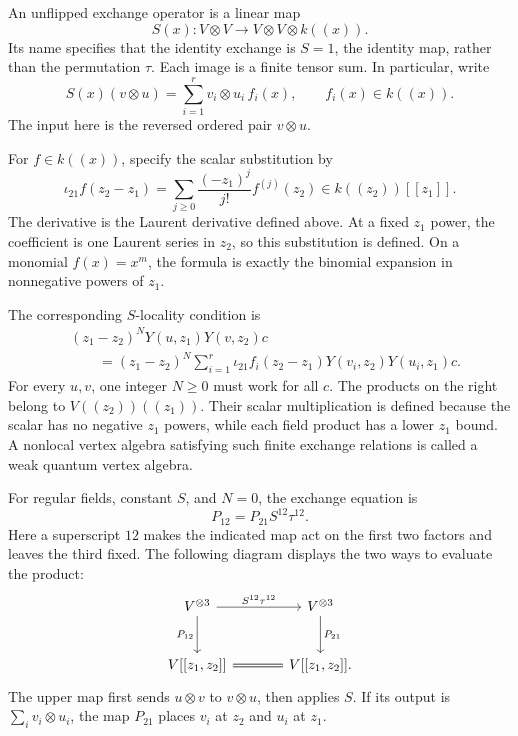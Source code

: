An unflipped exchange operator is a linear map
\[
 S(x):V\otimes V\longrightarrow V\otimes V\otimes k((x)).
\]
Its name specifies that the identity exchange is $S=1$, the
identity map, rather than the permutation $\tau$.
Each image is a finite tensor sum.
In particular, write
\[
 S(x)(v\otimes u)=\sum_{i=1}^r v_i\otimes u_i\,f_i(x),
 \qquad f_i(x)\in k((x)).
\]
The input here is the reversed ordered pair $v\otimes u$.

For $f\in k((x))$, specify the scalar substitution by
\[
 \iota_{21}f(z_2-z_1)
   =\sum_{j\geq0}\frac{(-z_1)^j}{j!}f^{(j)}(z_2)
   \in k((z_2))[[z_1]].
\]
The derivative is the Laurent derivative defined above.
At a fixed $z_1$ power, the coefficient is one Laurent series
in $z_2$, so this substitution is defined.
On a monomial $f(x)=x^m$, the formula is exactly the binomial
expansion in nonnegative powers of $z_1$.

The corresponding $S$-locality condition is
\begin{equation}\label{eq:vertex-s-locality}
 \begin{aligned}
 &(z_1-z_2)^N Y(u,z_1)Y(v,z_2)c\\
 &\qquad=(z_1-z_2)^N\sum_{i=1}^r
    \iota_{21}f_i(z_2-z_1)Y(v_i,z_2)Y(u_i,z_1)c.
 \end{aligned}
\end{equation}
For every $u,v$, one integer $N\geq0$ must work for all $c$.
The products on the right belong to $V((z_2))((z_1))$.
Their scalar multiplication is defined because the scalar has no
negative $z_1$ powers, while each field product has a lower $z_1$ bound.
A nonlocal vertex algebra satisfying such finite exchange relations
is called a weak quantum vertex algebra.

For regular fields, constant $S$, and $N=0$, the exchange equation is
\begin{equation}\label{eq:vertex-ordered-exchange}
 P_{12}=P_{21}S^{12}\tau^{12}.
\end{equation}
Here a superscript $12$ makes the indicated map act on the first
two factors and leaves the third fixed.
The following diagram displays the two ways to evaluate the product:
\[
 \begin{tikzcd}[column sep=large,row sep=large]
 V^{\otimes3} \arrow[r,"S^{12}\tau^{12}"]
                \arrow[d,"P_{12}"']
   & V^{\otimes3} \arrow[d,"P_{21}"]\\
 V[[z_1,z_2]] \arrow[r,equal]
   & V[[z_1,z_2]].
 \end{tikzcd}
\]
The upper map first sends $u\otimes v$ to $v\otimes u$, then applies $S$.
If its output is $\sum_i v_i\otimes u_i$, the map $P_{21}$
places $v_i$ at $z_2$ and $u_i$ at $z_1$.

